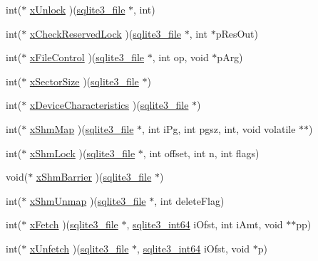 \begin{DoxyCompactItemize}
\item 
int($\ast$ \hyperlink{structsqlite3__io__methods_a5ce75a5ca2df9c1edcaef74d4c0d7e38}{x\+Unlock} )(\hyperlink{structsqlite3__file}{sqlite3\+\_\+file} $\ast$, int)
\item 
int($\ast$ \hyperlink{structsqlite3__io__methods_a484752731e4a054c97497ad8d48a344b}{x\+Check\+Reserved\+Lock} )(\hyperlink{structsqlite3__file}{sqlite3\+\_\+file} $\ast$, int $\ast$p\+Res\+Out)
\item 
int($\ast$ \hyperlink{structsqlite3__io__methods_a913b12deb1dcae2c61b90776bcd9d19c}{x\+File\+Control} )(\hyperlink{structsqlite3__file}{sqlite3\+\_\+file} $\ast$, int op, void $\ast$p\+Arg)
\item 
int($\ast$ \hyperlink{structsqlite3__io__methods_a7a1c0cf3c4de6402a69f50e625be5ca2}{x\+Sector\+Size} )(\hyperlink{structsqlite3__file}{sqlite3\+\_\+file} $\ast$)
\item 
int($\ast$ \hyperlink{structsqlite3__io__methods_abbf1b4769c310bfee517af815eed93e9}{x\+Device\+Characteristics} )(\hyperlink{structsqlite3__file}{sqlite3\+\_\+file} $\ast$)
\item 
int($\ast$ \hyperlink{structsqlite3__io__methods_a2222efe012f210417f9881103014cdc5}{x\+Shm\+Map} )(\hyperlink{structsqlite3__file}{sqlite3\+\_\+file} $\ast$, int i\+Pg, int pgsz, int, void volatile $\ast$$\ast$)
\item 
int($\ast$ \hyperlink{structsqlite3__io__methods_a2dbd4777e8ebce36b91dd5d64aef9bbf}{x\+Shm\+Lock} )(\hyperlink{structsqlite3__file}{sqlite3\+\_\+file} $\ast$, int offset, int n, int flags)
\item 
void($\ast$ \hyperlink{structsqlite3__io__methods_aa4e436fef318c4702940da870f8e2710}{x\+Shm\+Barrier} )(\hyperlink{structsqlite3__file}{sqlite3\+\_\+file} $\ast$)
\item 
int($\ast$ \hyperlink{structsqlite3__io__methods_a494ae8bbfe91c38598c73aaa18f1848f}{x\+Shm\+Unmap} )(\hyperlink{structsqlite3__file}{sqlite3\+\_\+file} $\ast$, int delete\+Flag)
\item 
int($\ast$ \hyperlink{structsqlite3__io__methods_a71e611fc755d95ffbd3e7ecb8cb5fae6}{x\+Fetch} )(\hyperlink{structsqlite3__file}{sqlite3\+\_\+file} $\ast$, \hyperlink{sqlite3_8h_a0a4d3e6c1ad46f90e746b920ab6ca0d2}{sqlite3\+\_\+int64} i\+Ofst, int i\+Amt, void $\ast$$\ast$pp)
\item 
int($\ast$ \hyperlink{structsqlite3__io__methods_abebf1bbaa50bea56f0e37d0f66193bda}{x\+Unfetch} )(\hyperlink{structsqlite3__file}{sqlite3\+\_\+file} $\ast$, \hyperlink{sqlite3_8h_a0a4d3e6c1ad46f90e746b920ab6ca0d2}{sqlite3\+\_\+int64} i\+Ofst, void $\ast$p)
\end{DoxyCompactItemize}


